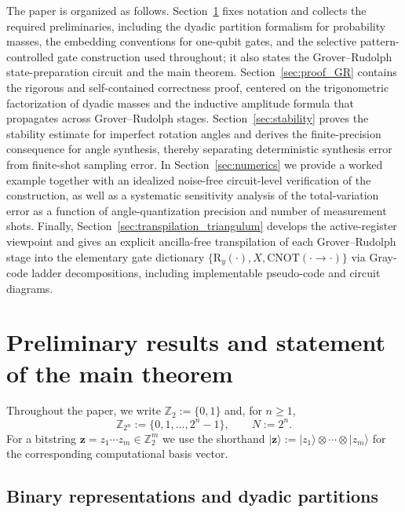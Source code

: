 \documentclass{article}
\newcommand{\RY}{\mathrm{R}_y}
\newcommand{\CNOT}{\mathrm{CNOT}}
\numberwithin{equation}{section}
\begin{document}
The paper is organized as follows.
Section~\ref{sec:prelim_main} fixes notation and collects the required preliminaries, including the
dyadic partition formalism for probability masses, the embedding conventions for one-qubit gates, and
the selective pattern-controlled gate construction used throughout; it also states the Grover--Rudolph
state-preparation circuit and the main theorem.
Section~\ref{sec:proof_GR} contains the rigorous and self-contained correctness proof, centered on the
trigonometric factorization of dyadic masses and the inductive amplitude formula that propagates across
Grover--Rudolph stages.
Section~\ref{sec:stability} proves the stability estimate for imperfect rotation angles and derives the
finite-precision consequence for angle synthesis, thereby separating deterministic synthesis error from
finite-shot sampling error.
In Section~\ref{sec:numerics} we provide a worked example together with an idealized noise-free
circuit-level verification of the construction, as well as a systematic sensitivity analysis of the
total-variation error as a function of angle-quantization precision and number of measurement shots.
Finally, Section~\ref{sec:transpilation_triangulum} develops the active-register viewpoint and gives an
explicit ancilla-free transpilation of each Grover--Rudolph stage into the elementary gate dictionary
\(\{\RY(\cdot),X,\CNOT(\cdot\to\cdot)\}\) via Gray-code ladder decompositions, including implementable
pseudo-code and circuit diagrams.


\section{Preliminary results and statement of the main theorem}\label{sec:prelim_main}

Throughout the paper, we write $\mathbb{Z}_2:=\{0,1\}$ and, for $n\ge 1$,
\[
\mathbb{Z}_{2^n}:=\{0,1,\dots,2^n-1\},\qquad N:=2^n.
\]
For a bitstring $\mathbf{z}=z_1\cdots z_m\in\mathbb{Z}_2^m$ we use the shorthand
$|\mathbf{z}\rangle:=|z_1\rangle\otimes\cdots\otimes|z_m\rangle$ for the corresponding
computational basis vector.

\subsection{Binary representations and dyadic partitions}\label{subsec:dyadic}
\end{document}
